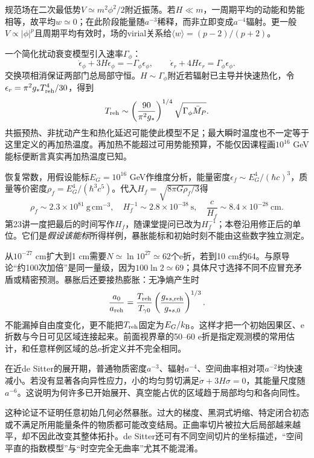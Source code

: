 规范场在二次最低势$V\simeq m^2\phi^2/2$附近振荡。若$H\ll m$，一周期平均的动能和势能相等，故平均$w\simeq0$；在此阶段能量随$a^{-3}$稀释，而非立即变成$a^{-4}$辐射。更一般$V\propto|\phi|^p$且周期平均有效时，场的virial关系给$\langle w\rangle=(p-2)/(p+2)$。

一个简化扰动衰变模型引入速率$\Gamma_\phi$：
\[
 \dot\epsilon_\phi+3H\epsilon_\phi=-\Gamma_\phi\epsilon_\phi,
 \qquad \dot\epsilon_r+4H\epsilon_r=\Gamma_\phi\epsilon_\phi.
\]
交换项相消保证两部门总局部守恒。$H\sim\Gamma_\phi$附近若辐射已主导并快速热化，令$\epsilon_r=\pi^2g_*T_{\rm reh}^4/30$，得到
\[
 T_{\rm reh}\sim\left(\frac{90}{\pi^2g_*}\right)^{1/4}
 \sqrt{\Gamma_\phi\bar M_P}.
\]
共振预热、非扰动产生和热化延迟可能使此模型不足；最大瞬时温度也不一定等于这里定义的再加热温度。再加热不能超过可用势能预算，不能仅因课程画$10^{16}$ GeV能标便断言真实再加热温度已知。

恢复常数，用假设能标$E_G=10^{16}$ GeV作维度分析，能量密度$\epsilon_f\sim E_G^4/(\hbar c)^3$，质量等价密度$\rho_f=E_G^4/(\hbar^3c^5)$。代入$H_f=\sqrt{8\pi G\rho_f/3}$得
\[
 \rho_f\sim2.3\times10^{81}\ \mathrm{g\,cm^{-3}},\quad
 H_f^{-1}\sim2.8\times10^{-38}\ \mathrm s,\quad
 \frac c{H_f}\sim8.4\times10^{-28}\ \mathrm{cm}.
\]
第23讲一度把最后的时间写作$H_f$，随课堂提问已改为$H_f^{-1}$；本卷沿用修正后的单位。它们是\emph{假设该能标}所得样例，暴胀能标和初始时刻不能由这些数字独立测定。

从$10^{-27}$ cm扩大到1 cm需要$N\simeq\ln10^{27}\simeq62$个e折，若到10 cm约64。与原导论“约100次加倍”是同一量级，因为$100\ln2\simeq69$；具体尺寸选择不同不应冒充矛盾或精密预测。暴胀后还要接热膨胀：无净熵产生时
\[
 \frac{a_0}{a_{\rm reh}}=
 \frac{T_{\rm reh}}{T_{\gamma0}}
 \left(\frac{g_{*s,\rm reh}}{g_{*s,0}}\right)^{1/3}.
\]
不能漏掉自由度变化，更不能把$T_{\rm reh}$固定为$E_G/k_{\mathrm B}$。这样才把一个初始因果区、e折数与今日可见区域连接起来。前面视界章的50--60 e折是指定观测模的常用估计，和任意样例区域的总e折定义并不完全相同。

在近de Sitter的展开期，普通物质密度$a^{-3}$、辐射$a^{-4}$、空间曲率相对项$a^{-2}$均快速减小。若没有显著各向异性应力，小的均匀剪切满足$\dot\sigma+3H\sigma=0$，其能量尺度随$a^{-6}$。这说明为何许多已开始展开、真空能占优的区域趋于局部均匀和各向同性。

这种论证不证明任意初始几何必然暴胀。过大的梯度、黑洞式坍缩、特定闭合初态或不满足所用能量条件的物质都可能改变结局。正曲率切片被拉大后局部越来越平，却不因此改变其整体拓扑。de Sitter还可有不同空间切片的坐标描述，“空间平直的指数模型”与“时空完全无曲率”尤其不能混淆。

